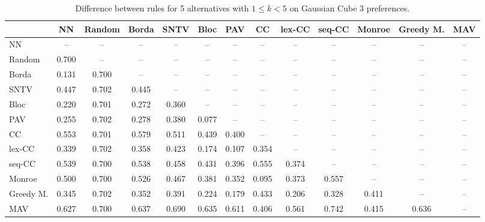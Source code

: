 
\begin{table*}[h!]
\centering
\begin{tabular}{lcccccccccccc}
\toprule
 & NN & Random & Borda & SNTV & Bloc & PAV & CC & lex-CC & seq-CC & Monroe & Greedy M. & MAV \\
\midrule
NN & -- & -- & -- & -- & -- & -- & -- & -- & -- & -- & -- & -- \\
Random & 0.700 & -- & -- & -- & -- & -- & -- & -- & -- & -- & -- & -- \\
Borda & 0.131 & 0.700 & -- & -- & -- & -- & -- & -- & -- & -- & -- & -- \\
SNTV & 0.447 & 0.702 & 0.445 & -- & -- & -- & -- & -- & -- & -- & -- & -- \\
Bloc & 0.220 & 0.701 & 0.272 & 0.360 & -- & -- & -- & -- & -- & -- & -- & -- \\
PAV & 0.255 & 0.702 & 0.278 & 0.380 & 0.077 & -- & -- & -- & -- & -- & -- & -- \\
CC & 0.553 & 0.701 & 0.579 & 0.511 & 0.439 & 0.400 & -- & -- & -- & -- & -- & -- \\
lex-CC & 0.339 & 0.702 & 0.358 & 0.423 & 0.174 & 0.107 & 0.354 & -- & -- & -- & -- & -- \\
seq-CC & 0.539 & 0.700 & 0.538 & 0.458 & 0.431 & 0.396 & 0.555 & 0.374 & -- & -- & -- & -- \\
Monroe & 0.500 & 0.700 & 0.526 & 0.467 & 0.381 & 0.352 & 0.095 & 0.373 & 0.557 & -- & -- & -- \\
Greedy M. & 0.345 & 0.702 & 0.352 & 0.391 & 0.224 & 0.179 & 0.433 & 0.206 & 0.328 & 0.411 & -- & -- \\
MAV & 0.627 & 0.700 & 0.637 & 0.690 & 0.635 & 0.611 & 0.406 & 0.561 & 0.742 & 0.415 & 0.636 & -- \\
\bottomrule
\end{tabular}

\caption{Difference between rules for 5 alternatives with $1 \leq k < 5$ on Gaussian Cube 3 preferences.}
\end{table*}
